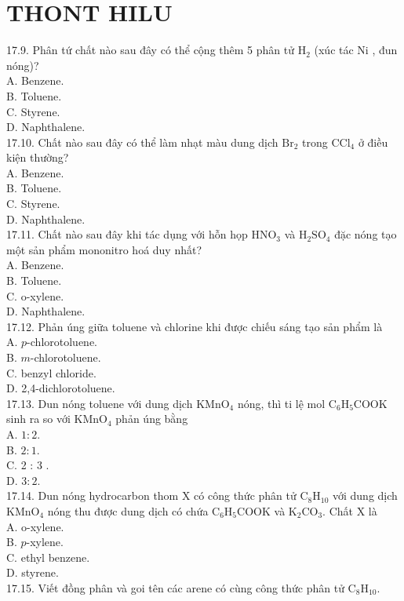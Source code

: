 \documentclass[10pt]{article}
\begin{document}
\section*{THONT HILU}
17.9. Phân tứ chất nào sau đây có thể cộng thêm 5 phân tử $\mathrm{H}_{2}$ (xúc tác Ni , đun nóng)?\\
A. Benzene.\\
B. Toluene.\\
C. Styrene.\\
D. Naphthalene.\\
17.10. Chất nào sau đây có thể làm nhạt màu dung dịch $\mathrm{Br}_{2}$ trong $\mathrm{CCl}_{4}$ ở điều kiện thường?\\
A. Benzene.\\
B. Toluene.\\
C. Styrene.\\
D. Naphthalene.\\
17.11. Chất nào sau đây khi tác dụng với hỗn họp $\mathrm{HNO}_{3}$ và $\mathrm{H}_{2} \mathrm{SO}_{4}$ đặc nóng tạo một sản phẩm mononitro hoá duy nhất?\\
A. Benzene.\\
B. Toluene.\\
C. o-xylene.\\
D. Naphthalene.\\
17.12. Phản úng giữa toluene và chlorine khi được chiếu sáng tạo sản phẩm là\\
A. $p$-chlorotoluene.\\
B. $m$-chlorotoluene.\\
C. benzyl chloride.\\
D. 2,4-dichlorotoluene.\\
17.13. Dun nóng toluene với dung dịch $\mathrm{KMnO}_{4}$ nóng, thì ti lệ mol $\mathrm{C}_{6} \mathrm{H}_{5} \mathrm{COOK}$ sinh ra so với $\mathrm{KMnO}_{4}$ phản úng bằng\\
A. $1: 2$.\\
B. $2: 1$.\\
C. 2 : 3 .\\
D. $3: 2$.\\
17.14. Dun nóng hydrocarbon thom X có công thức phân tử $\mathrm{C}_{8} \mathrm{H}_{10}$ với dung dịch $\mathrm{KMnO}_{4}$ nóng thu được dung dịch có chứa $\mathrm{C}_{6} \mathrm{H}_{5} \mathrm{COOK}$ và $\mathrm{K}_{2} \mathrm{CO}_{3}$. Chất X là\\
A. o-xylene.\\
B. $p$-xylene.\\
C. ethyl benzene.\\
D. styrene.\\
17.15. Viết đồng phân và goi tên các arene có cùng công thức phân tử $\mathrm{C}_{8} \mathrm{H}_{10}$.
\end{document}
